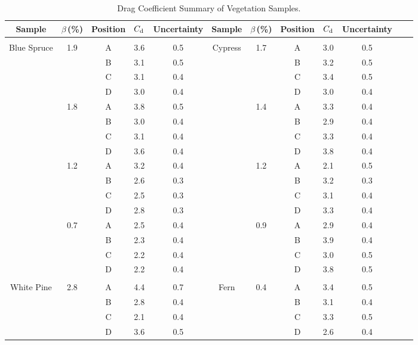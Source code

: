 \documentclass[12pt]{article}
\begin{document}
\begin{table}[!]

\caption{Drag Coefficient Summary of Vegetation Samples.}
\label{tab:SumTable}
\centering
	\footnotesize
	\begin{tabular}{cccccccccccc}
			\hline
\textbf{Sample}		& \textbf{$\beta$\,(\%)}		&\textbf{Position}& $C_{\rm d}$ &\textbf{Uncertainty}	&\textbf{Sample}		& \textbf{$\beta$\,(\%)}&\textbf{Position}& 	\textbf{$C_{\rm d}$ }&\textbf{Uncertainty}\\
\hline
\\[0.05cm]
Blue Spruce			&	1.9	&	A	& 	3.6		&	0.5			& Cypress       		&	1.7	&	A	& 	3.0	&	0.5	\\
				&		&	B	& 	3.1		&	0.5			&				&		&	B	& 	3.2	&	0.5	\\
				&		&	C	& 	3.1		&	0.4			&				&		&	C	& 	3.4	&	0.5	\\
				&		&	D	& 	3.0		&	0.4			&				&		&	D	& 	3.0	&	0.4	\\
				&	1.8	&	A	& 	3.8		&	0.5			&				&	1.4	&	A	& 	3.3	&	0.4	\\
				&		&	B	& 	3.0		&	0.4			&				&		&	B	& 	2.9	&	0.4	\\
				&		&	C	& 	3.1		&	0.4			&				&		&	C	& 	3.3	&	0.4	\\
				&		&	D	& 	3.6		&	0.4			&				&		&	D	& 	3.8	&	0.4	\\
				&	1.2	&	A	& 	3.2		&	0.4			&				&	1.2	&	A	& 	2.1	&	0.5	\\
				&		&	B	& 	2.6		&	0.3			&				&		&	B	& 	3.2	&	0.3	\\
				&		&	C	& 	2.5		&	0.3			&				&		&	C	& 	3.1	&	0.4	\\
				&		&	D	& 	2.8		&	0.3			&				&		&	D	& 	3.3	&	0.4	\\
				&	0.7	&	A	& 	2.5		&	0.4			&				&	0.9	&	A	& 	2.9	&	0.4	\\
				&		&	B	& 	2.3		&	0.4			&				&		&	B	& 	3.9	&	0.4	\\
				&		&	C	& 	2.2		&	0.4			&				&		&	C	& 	3.0	&	0.5	\\
				&		&	D	& 	2.2		&	0.4			&				&		&	D	& 	3.8	&	0.5	\\
				&		&		& 			&				&				&		&		& 		&		\\
White Pine	       		&	2.8	&	A	& 	4.4		&	0.7			& Fern	       		&	0.4	&	A	& 	3.4	&	0.5	\\
				&		&	B	& 	2.8		&	0.4			&				&		&	B	& 	3.1	&	0.4	\\
				&		&	C	& 	2.1		&	0.4			&				&		&	C	& 	3.3	&	0.5	\\
				&		&	D	& 	3.6		&	0.5			&				&		&	D	& 	2.6	&	0.4	\\

\end{tabular}
\end{table}
\end{document}
